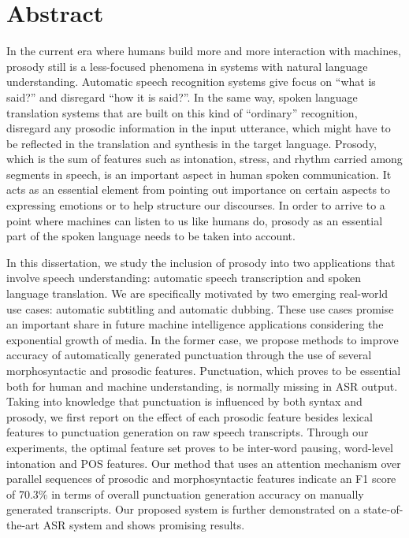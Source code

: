\section*{\Large \sffamily Abstract}

In the current era where humans build more and more interaction with machines, prosody still is a less-focused phenomena in systems with natural language understanding. Automatic speech recognition systems give focus on ``what is said?'' and disregard ``how it is said?''. In the same way, spoken language translation systems that are built on this kind of “ordinary” recognition, disregard any prosodic information in the input utterance, which might have to be reflected in the translation and synthesis in the target language. Prosody, which is the sum of features such as intonation, stress, and rhythm carried among segments in speech, is an important aspect in human spoken communication. It acts as an essential element from pointing out importance on certain aspects to expressing emotions or to help structure our discourses. In order to arrive to a point where machines can listen to us like humans do, prosody as an essential part of the spoken language needs to be taken into account. 

In this dissertation, we study the inclusion of prosody into two applications that involve speech understanding: automatic speech transcription and spoken language translation. We are specifically motivated by two emerging real-world use cases: automatic subtitling and automatic dubbing. These use cases promise an important share in future machine intelligence applications considering the exponential growth of media. In the former case, we propose methods to improve accuracy of automatically generated punctuation through the use of several morphosyntactic and prosodic features. Punctuation, which proves to be essential both for human and machine understanding, is normally missing in ASR output. Taking into knowledge that punctuation is influenced by both syntax and prosody, we first report on the effect of each prosodic feature besides lexical features to punctuation generation on raw speech transcripts. Through our experiments, the optimal feature set proves to be inter-word pausing, word-level intonation and POS features. Our method that uses an attention mechanism over parallel sequences of prosodic and morphosyntactic features indicate an F1 score of 70.3\% in terms of overall punctuation generation accuracy on manually generated transcripts. Our proposed system is further demonstrated on a state-of-the-art ASR system and shows promising results. 

